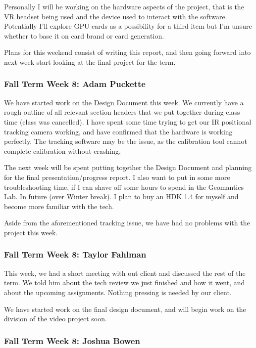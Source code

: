 \documentclass[draftclsnofoot,onecolumn]{IEEEtran}
\begin{document}
Personally I will be working on the hardware aspects of the project, that is the VR headset being used and the device used to interact with the software. Potentially I'll explore GPU cards as a possibility for a third item but I'm unsure whether to base it on card brand or card generation.

Plans for this weekend consist of writing this report, and then going forward into next week start looking at the final project for the term.

\subsubsection{Fall Term Week 8: Adam Puckette}

We have started work on the Design Document this week. We currently have a rough outline of all relevant section headers that we put together during class time (class was cancelled). I have spent some time trying to get our IR positional tracking camera working, and have confirmed that the hardware is working perfectly. The tracking software may be the issue, as the calibration tool cannot complete calibration without crashing.

The next week will be spent putting together the Design Document and planning for the final presentation/progress report. I also want to put in some more troubleshooting time, if I can shave off some hours to spend in the Geomantics Lab. In future (over Winter break). I plan to buy an HDK 1.4 for myself and become more familiar with the tech.

Aside from the aforementioned tracking issue, we have had no problems with the project this week.

\subsubsection{Fall Term Week 8: Taylor Fahlman}

This week, we had a short meeting with out client and discussed the rest of the term. We told him about the tech review we just finished and how it went, and about the upcoming assignments. Nothing pressing is needed by our client.

We have started work on the final design document, and will begin work on the division of the video project soon.

\subsubsection{Fall Term Week 8: Joshua Bowen}
\end{document}
